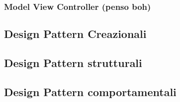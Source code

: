 {{		\subsubsection{Model View Controller (penso boh)}{
				
		}
	}
	\subsection{Design Pattern Creazionali}{
				
	}
	\subsection{Design Pattern strutturali}{
		
	}
	\subsection{Design Pattern comportamentali}{
		
	}
}